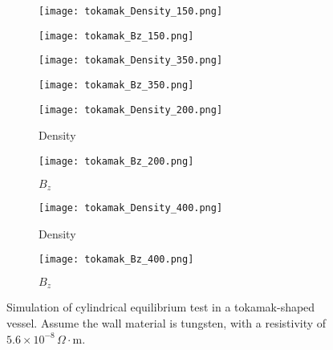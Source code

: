 \begin{figure}[htbp]
	\vspace{-6mm} %
	
	\hspace{-6mm}
	\begin{subfigure}{0.26\textwidth}
		\texttt{[image: tokamak\_Density\_150.png]}
	\end{subfigure}
	\hspace{-4mm} %
	\begin{subfigure}{0.26\textwidth}
		\texttt{[image: tokamak\_Bz\_150.png]}
	\end{subfigure}
	\hspace{2mm} %
	\begin{subfigure}{0.26\textwidth}
		\texttt{[image: tokamak\_Density\_350.png]}
	\end{subfigure}
	\hspace{-4mm} %
	\begin{subfigure}{0.26\textwidth}
		\texttt{[image: tokamak\_Bz\_350.png]}
	\end{subfigure}
	\hspace{-6mm}
	
	\vspace{-6mm} %
	
	\hspace{-6mm}
	\begin{subfigure}{0.26\textwidth}
		\texttt{[image: tokamak\_Density\_200.png]}
		\caption*{Density}
	\end{subfigure}
	\hspace{-4mm} %
	\begin{subfigure}{0.26\textwidth}
		\texttt{[image: tokamak\_Bz\_200.png]}
		\caption*{$B_z$}
	\end{subfigure}
	\hspace{2mm} %
	\begin{subfigure}{0.26\textwidth}
		\texttt{[image: tokamak\_Density\_400.png]}
		\caption*{Density}
	\end{subfigure}
	\hspace{-4mm} %
	\begin{subfigure}{0.26\textwidth}
		\texttt{[image: tokamak\_Bz\_400.png]}
		\caption*{$B_z$}
	\end{subfigure}
	\hspace{-6mm}
	
	\vspace{1mm} %
		
	\caption[Tokamak Application]{Simulation of cylindrical equilibrium test in a tokamak-shaped vessel. Assume the wall material is tungsten, with a resistivity of $5.6 \times 10^{-8} \, \Omega \cdot \text{m}$.}
	\label{fig:tokamak_application}
\end{figure} 


  
